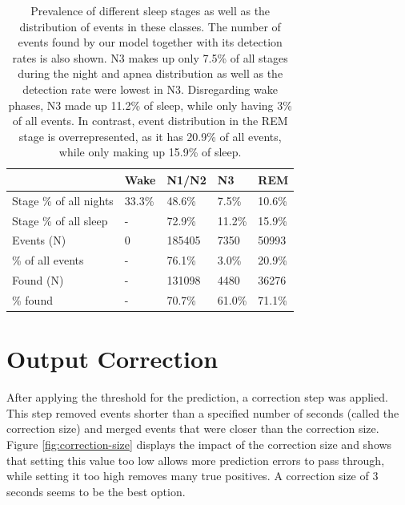\renewcommand{\arraystretch}{1.5}
\begin{table}
    \centering
    \begin{tabular}{ l p{1.6cm} p{1.6cm} p{1.6cm} p{1.6cm} }
        & Wake & N1/N2 & N3 & REM \\
        \hline
        Stage \% of all nights & 33.3\% & 48.6\% & 7.5\% & 10.6\% \\
        Stage \% of all sleep & - & 72.9\% & 11.2\% & 15.9\% \\
        \hline
        Events (N) & 0 & 185405 & 7350 & 50993 \\
        \% of all events & - & 76.1\% & 3.0\% & 20.9\% \\
        \hline
        Found (N) & - & 131098 & 4480 & 36276 \\
        \% found & - & 70.7\% & 61.0\% & 71.1\% \\
    \end{tabular}
    \caption{Prevalence of different sleep stages as well as the distribution of events in these classes. The number of events found by our model together with its detection rates is also shown. N3 makes up only 7.5\% of all stages during the night and apnea distribution as well as the detection rate were lowest in N3. Disregarding wake phases, N3 made up 11.2\% of sleep, while only having 3\% of all events. In contrast, event distribution in the REM stage is overrepresented, as it has 20.9\% of all events, while only making up 15.9\% of sleep. \label{tab:sleep-stage-distribution}}
\end{table}

\section{Output Correction}

After applying the threshold for the prediction, a correction step was applied. This step removed events shorter than a specified number of seconds (called the correction size) and merged events that were closer than the correction size. Figure \ref{fig:correction-size} displays the impact of the correction size and shows that setting this value too low allows more prediction errors to pass through, while setting it too high removes many true positives. A correction size of 3 seconds seems to be the best option.

